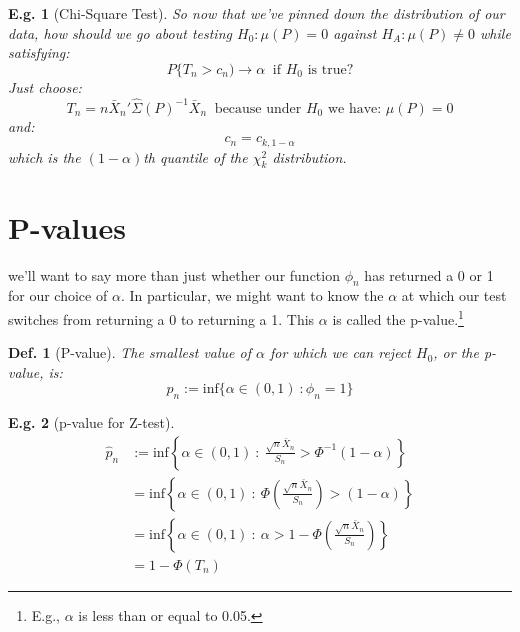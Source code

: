 \documentclass{tufte-book}
\theoremstyle{mytheoremstyle}
\theoremstyle{mylemstyle}
\theoremstyle{mydefstyle}
\newtheorem*{mydef}{Def.}
\newtheorem*{ex}{E.g.}
\begin{document}
\begin{ex}[Chi-Square Test]
So now that we've pinned down the distribution of our data, how should we go about testing \(H_0: \mu(P) = 0\) against \(H_A: \mu(P) \ne 0\) while satisfying:
	\[P\{T_n > c_n) \rightarrow \alpha\ \text{ if \(H_0\) is true?}\]
Just choose:
	\[T_n = n\bar{X}_n'\hat{\Sigma}(P)^{-1}\bar{X}_n\ \text{ because under \(H_0\) we have: \(\mu(P) = 0\)}\]
and:
	\[c_n = c_{k, 1-\alpha}\]
which is the \((1-\alpha)\)th quantile of the \(\chi^2_k\) distribution. 
\end{ex}


\section{P-values}
 we'll want to say more than just whether our function \(\phi_n\) has returned a 0 or 1 for our choice of \(\alpha\). In particular, we might want to know the \(\alpha\) at which our test switches from returning a 0 to returning a 1. This \(\alpha\) is called the p-value.\footnote{E.g., \(\alpha\) is less than or equal to 0.05.}
\begin{mydef}[P-value] The smallest value of \(\alpha\) for which we can reject \(H_0\), or the p-value, is:
	\[p_n := \text{inf}\{\alpha \in (0, 1)\ : \phi_n = 1\} \]
\end{mydef}

\begin{ex}[p-value for Z-test] 
	\begin{align*}
		\hat{p}_n & :=  \text{inf}\left\{\alpha \in (0, 1)\ :\ \frac{\sqrt{n} \bar{X}_n }{S_n} > \Phi^{-1} (1-\alpha) \right\} \\
				& = \text{inf}\left\{\alpha \in (0, 1)\ :\ \Phi\left(\frac{\sqrt{n} \bar{X}_n}{S_n}\right) > (1-\alpha) \right\} \\
				& = \text{inf}\left\{\alpha \in (0, 1)\ :\ \alpha > 1 - \Phi\left(\frac{\sqrt{n} \bar{X}_n}{S_n}\right) \right\} \\
				& = 1 - \Phi(T_n)
	\end{align*}
\end{ex}
\end{document}
